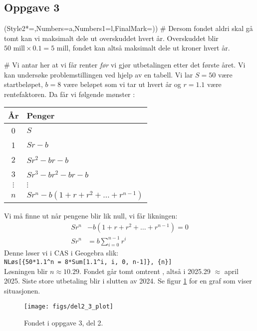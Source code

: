 \subsection*{Oppgave 3}
\begin{easylist}[enumerate]
	\ListProperties(Style2*=,Numbers=a,Numbers1=l,FinalMark={)})
	# Dersom fondet aldri skal gå tomt kan vi maksimalt dele ut overskuddet hvert år.
	Overskuddet blir $50 \text{ mill} \times 0.1 = 5 \text{ mill}$, fondet kan altså maksimalt dele ut  kroner hvert år.
	
	# Vi antar her at vi får renter \emph{før} vi gjør utbetalingen etter det første året. 
	Vi kan undersøke problemstillingen ved hjelp av en tabell.
	Vi lar $S = 50$ være startbeløpet, $b = 8$ være beløpet som vi tar ut hvert år og $r = 1.1$ være rentefaktoren.
	Da får vi følgende mønster :
	\begin{center}
		\begin{tabular}{cl}
			\textbf{År} & \textbf{Penger} \\ \hline
			0 & $S$ \\
			1 & $Sr - b$ \\
			2 & $Sr^2 - br - b$ \\
			3 & $Sr^3 - br^2 - br - b$ \\
			$\vdots$ & $\vdots$ \\
			$n$ & $Sr^n - b \left( 1 + r + r^2 + \dots + r^{n-1}\right)$
		\end{tabular}
	\end{center}
	Vi må finne ut når pengene blir lik null, vi får likningen:
	\begin{align*}
		Sr^n &- b \left( 1 + r + r^2 + \dots + r^{n-1}\right) = 0 \\
		Sr^n &= b \sum_{i=0}^{n-1} r^i
	\end{align*}
	Denne løser vi i CAS i Geogebra slik: \\
	\texttt{NLøs[\{50*1.1\textasciicircum n = 8*Sum[1.1\textasciicircum i, i, 0, n-1]\}, \{n\}]} \\
	Løsningen blir $n \approx 10.29$. Fondet går tomt omtrent ,
	altså i 2025.29 $\approx$ april 2025. Siste store utbetaling blir i slutten av 2024.
	Se figur \ref{fig:del23plot} for en graf som viser situasjonen.
	
	
\begin{figure}[th!]
	\centering
	\texttt{[image: figs/del2\_3\_plot]}
	\caption{Fondet i oppgave 3, del 2.}
	\label{fig:del23plot}
\end{figure}
\end{easylist}

